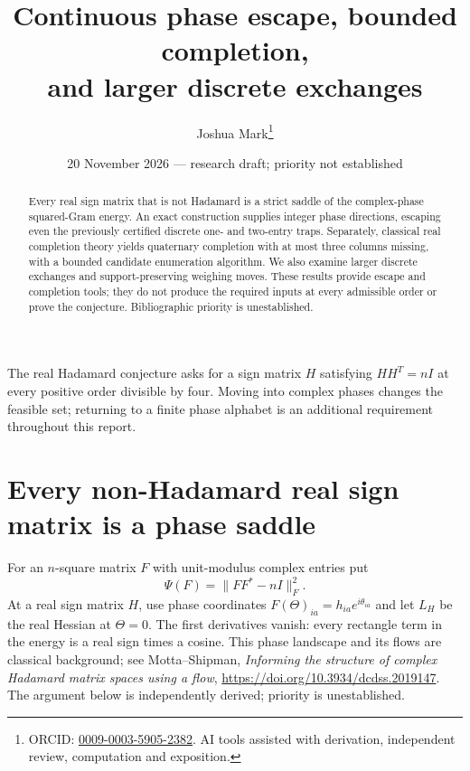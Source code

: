 \documentclass[11pt]{article}
\title{Continuous phase escape, bounded completion,\\and larger discrete exchanges}
\author{Joshua Mark\thanks{ORCID: \href{https://orcid.org/0009-0003-5905-2382}{0009-0003-5905-2382}. AI tools assisted with derivation, independent review, computation and exposition.}}
\date{20 November 2026 --- research draft; priority not established}
\begin{document}
\maketitle

\begin{abstract}
Every real sign matrix that is not Hadamard is a strict saddle of
the complex-phase squared-Gram energy. An exact construction supplies
integer phase directions, escaping even the previously certified
discrete one- and two-entry traps. Separately, classical real completion
theory yields quaternary completion with at most three columns missing,
with a bounded candidate enumeration algorithm. We also examine
larger discrete exchanges and support-preserving weighing moves.
These results provide escape and completion tools; they do not produce
the required inputs at every admissible order or prove the conjecture.
Bibliographic priority is unestablished.
\end{abstract}
The real Hadamard conjecture asks for a sign matrix $H$ satisfying
$HH^T=nI$ at every positive order divisible by four.
Moving into complex phases changes the feasible set; returning to a
finite phase alphabet is an additional requirement throughout this report.
\section{Every non-Hadamard real sign matrix is a phase saddle}
For an $n$-square matrix $F$ with unit-modulus complex entries put
\[
 \Psi(F)=\|FF^*-nI\|_F^2.
\]
At a real sign matrix $H$, use phase coordinates
$F(\Theta)_{ia}=h_{ia}e^{i\theta_{ia}}$ and let $L_H$ be the real
Hessian at $\Theta=0$. The first derivatives vanish: every rectangle
term in the energy is a real sign times a cosine.
This phase landscape and its flows are classical background;
see Motta--Shipman, \emph{Informing the structure of complex Hadamard
matrix spaces using a flow},
\url{https://doi.org/10.3934/dcdss.2019147}.
The argument below is independently derived; priority is unestablished.
\end{document}
